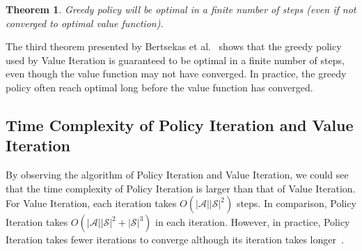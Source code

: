\documentclass[11pt]{article}
\newtheorem{theorem}{Theorem}
\begin{document}
\begin{theorem}
Greedy policy will be optimal in a finite number of steps (even if not converged to optimal value function).
\end{theorem}

The third theorem presented by Bertsekas et al.~\cite{beutler1989dynamic} shows that the greedy policy used by Value Iteration is guaranteed to be optimal in a finite number of steps, even though the value function may not have converged. In practice, the greedy policy often reach optimal long before the value function has converged.

\subsection{Time Complexity of Policy Iteration and Value Iteration}

By observing the algorithm of Policy Iteration and Value Iteration, we could see that the time complexity of Policy Iteration is larger than that of Value Iteration. For Value Iteration, each iteration takes $O(|\mathcal{A}||\mathcal{S}|^2)$ steps. In comparison, Policy Iteration takes $O(|\mathcal{A}||\mathcal{S}|^2 + |\mathcal{S}|^3)$ in each iteration. However, in practice, Policy Iteration takes fewer iterations to converge although its iteration takes longer~\cite{10601lecture15, kaelbling1996reinforcement}.


{


}
\end{document}
